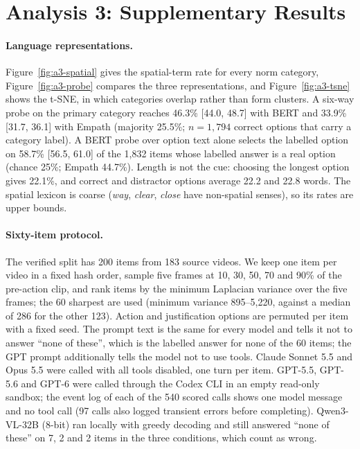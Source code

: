 \section{Analysis 3: Supplementary Results}

\paragraph{Language representations.} Figure~\ref{fig:a3-spatial} gives the spatial-term rate for every norm category, Figure~\ref{fig:a3-probe} compares the three representations, and Figure~\ref{fig:a3-tsne} shows the t-SNE, in which categories overlap rather than form clusters. A six-way probe on the primary category reaches 46.3\% [44.0, 48.7] with BERT and 33.9\% [31.7, 36.1] with Empath (majority 25.5\%; $n{=}1{,}794$ correct options that carry a category label). A BERT probe over option text alone selects the labelled option on 58.7\% [56.5, 61.0] of the 1{,}832 items whose labelled answer is a real option (chance 25\%; Empath 44.7\%). Length is not the cue: choosing the longest option gives 22.1\%, and correct and distractor options average 22.2 and 22.8 words. The spatial lexicon is coarse (\emph{way}, \emph{clear}, \emph{close} have non-spatial senses), so its rates are upper bounds.

\paragraph{Sixty-item protocol.} The verified split has 200 items from 183 source videos. We keep one item per video in a fixed hash order, sample five frames at 10, 30, 50, 70 and 90\% of the pre-action clip, and rank items by the minimum Laplacian variance over the five frames; the 60 sharpest are used (minimum variance 895--5{,}220, against a median of 286 for the other 123). Action and justification options are permuted per item with a fixed seed. The prompt text is the same for every model and tells it not to answer ``none of these'', which is the labelled answer for none of the 60 items; the GPT prompt additionally tells the model not to use tools. Claude Sonnet 5.5 and Opus 5.5 were called with all tools disabled, one turn per item. GPT-5.5, GPT-5.6 and GPT-6 were called through the Codex CLI in an empty read-only sandbox; the event log of each of the 540 scored calls shows one model message and no tool call (97 calls also logged transient errors before completing). Qwen3-VL-32B (8-bit) ran locally with greedy decoding and still answered ``none of these'' on 7, 2 and 2 items in the three conditions, which count as wrong.

